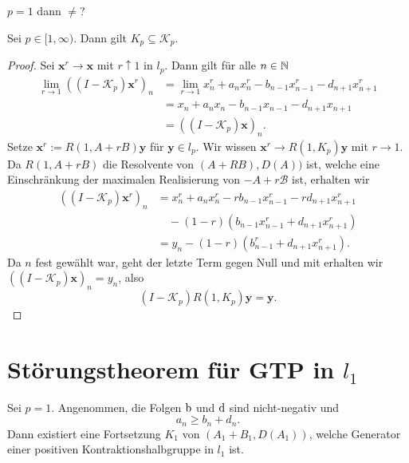 \begin{bem}
$p=1$ dann $\neq$?
\end{bem}


\begin{fsatz}
Sei $p\in[1,\infty)$. Dann gilt $K_p\subseteq \mathcal K_p$.
\end{fsatz}


\begin{proof}
Sei $\textbf{x}^r\to\textbf{x}$ mit $r\uparrow 1$ in $l_p$. Dann gilt für alle $n\in\mathbb{N}$
\begin{align}
\lim_{r\to1}((I-\mathcal K_p)\textbf{x}^r)_n
&=\lim_{r\to 1}x_n^r + a_nx_n^r - b_{n-1}x_{n-1}^r - d_{n+1}x_{n+1}^r\\
&=x_n+a_nx_n - b_{n-1}x_{n-1} - d_{n+1}x_{n+1}\\
&=((I-\mathcal K_p)\textbf{x})_n.
\end{align}
Setze $\textbf{x}^r:=R(1, A+rB)\textbf{y}$ für $\textbf{y}\in l_p$. Wir wissen $\textbf{x}^r\to R(1, K_p)\textbf{y}$ mit $r\to 1$. Da $R(1, A+rB)$ die Resolvente von $(A+RB), D(A))$ ist, welche eine Einschränkung der maximalen Realisierung von $\mathcal -A+r\mathcal B$ ist, erhalten wir
\begin{align}
((I-\mathcal K_p)\textbf{x}^r)_n
&= x_n^r + a_nx_n^r - rb_{n-1}x_{n-1}^r - rd_{n+1}x_{n+1}^r\\
&\quad -(1-r)(b_{n-1}x_{n-1}^r + d_{n+1}x_{n+1}^r)\\
&=y_n - (1-r)(b_{n-1}^r + d_{n+1}x_{n+1}^r).
\end{align}
Da $n$ fest gewählt war, geht der letzte Term gegen Null und mit \Cref{} erhalten wir $((I-\mathcal K_p)\textbf{x})_n=y_n$, also
\begin{equation}
(I-\mathcal K_p)R(1, K_p)\textbf{y}=\textbf{y}.
\end{equation}
\end{proof}

\section{Störungstheorem für GTP in $l_1$}

\begin{fsatz}
Sei $p=1$. Angenommen, die Folgen $\textbf{\textnormal{b}}$ und $\textbf{\textnormal{d}}$ sind nicht-negativ und 
\begin{equation}
a_n\geq b_n + d_n.
\end{equation}
Dann existiert eine Fortsetzung $K_1$ von $(A_1+B_1, D(A_1))$, welche Generator einer positiven Kontraktionshalbgruppe in $l_1$ ist.
\end{fsatz}


